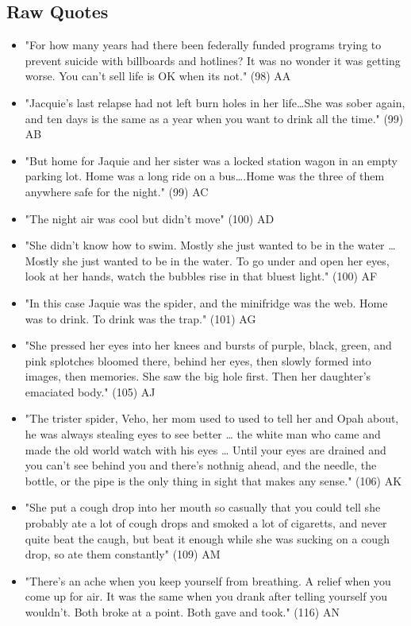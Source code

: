 \documentclass[letterpaper]{article}
\begin{document}
\subsection{Raw Quotes}
\label{sec:org15fb26e}
\begin{itemize}
\item "For how many years had there been federally funded programs trying to prevent suicide with billboards and hotlines? It was no wonder it was getting worse. You can't sell life is OK when its not." (98) AA
\item "Jacquie's last relapse had not left burn holes in her life\ldots{}She was sober again, and ten days is the same as a year when you want to drink all the time." (99) AB
\item "But home for Jaquie and her sister was a locked station wagon in an empty parking lot. Home was a long ride on a bus\ldots{}.Home was the three of them anywhere safe for the night." (99) AC
\item "The night air was cool but didn't move" (100) AD
\item "She didn’t know how to swim. Mostly she just wanted to be in the water \ldots{} Mostly she just wanted to be in the water. To go under and open her eyes, look at her hands, watch the bubbles rise in that bluest light." (100) AF
\item "In this case Jaquie was the spider, and the minifridge was the web. Home was to drink. To drink was the trap." (101) AG
\item "She pressed her eyes into her knees and bursts of purple, black, green, and pink splotches bloomed there, behind her eyes, then slowly formed into images, then memories. She saw the big hole first. Then her daughter's emaciated body." (105) AJ
\item "The trister spider, Veho, her mom used to used to tell her and Opah about, he was always stealing eyes to see better \ldots{} the white man who came and made the old world watch with his eyes \ldots{} Until your eyes are drained and you can't see behind you and there's nothnig ahead, and the needle, the bottle, or the pipe is the only thing in sight that makes any sense." (106) AK
\item "She put a cough drop into her mouth so casually that you could tell she probably ate a lot of cough drops and smoked a lot of cigaretts, and never quite beat the caugh, but beat it enough while she was sucking on a cough drop, so ate them constantly" (109) AM
\item "There's an ache when you keep yourself from breathing. A relief when you come up for air. It was the same when you drank after telling yourself you wouldn't. Both broke at a point. Both gave and took." (116) AN

\end{itemize}
\end{document}
